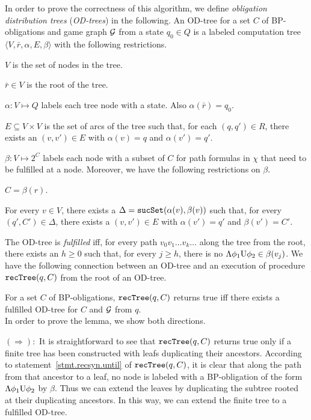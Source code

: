 In order to prove the correctness of this algorithm,
we define {\em obligation distribution trees} ({\em OD-trees})
in the following.
An OD-tree for a set $C$ of BP-obligations and
game graph ${\cal G}$
from a state $q_0\in Q$ is a labeled computation tree
$\langle V,\bar{r},\alpha,E,\beta\rangle$ with
the following restrictions.
\begin{list1}
\item $V$ is the set of nodes in the tree.
\item $\bar{r}\in V$ is the root of the tree.
\item $\alpha:V\mapsto Q$ labels each tree node with a state.
\label{reply2.correct.g2q} 
    Also $\alpha(\bar{r})=q_0$.
\item $E\subseteq V\times V$ is the set of arcs of the tree
    such that, for each $(q,q')\in R$,
    there exists an $(v,v')\in E$ with $\alpha(v)=q$ and $\alpha(v')=q'$.
\item $\beta:V\mapsto 2^C$ labels
    each node with a subset of $C$ for path formulas in $\chi$
    that need to be fulfilled at a node.  
    Moreover, we have the following restrictions on $\beta$.
    \begin{list2}
    \item $C= \beta(r)$.\label{reply2.C.eq.betar}  
    \item For every $v\in V$,
        there exists a 
        $\Delta=\mbox{\tt sucSet}(\alpha(v),\beta(v))$
        such that,
        for every $(q',C')\in \Delta$,
        there exists a $(v,v')\in E$ with
        $\alpha(v')=q'$ and $\beta(v')=C'$.
    \end{list2}
\end{list1}
The OD-tree is {\em fulfilled} iff, for every
path $v_0v_1\ldots v_k\ldots$ along the tree from the root,
there exists an $h\geq 0$ such that,
for every $j\geq h$, there is no $\Lambda\phi_1\textrm{U}\phi_2\in \beta(v_j)$.  
We have the following connection between an OD-tree and an
execution of procedure
\mbox{$\mbox{\tt recTree}(q,C)$}
from the root of an OD-tree.

{\lemma \label{lemma.rectree.sitree}
For a set $C$ of BP-obligations, 
$\mbox{\tt recTree}(q,C)$ returns true iff
there exists a fulfilled OD-tree for $C$ and ${\cal G}$ from $q$.
}\\\pf 
In order to prove the lemma, we show both directions.

\noindent $(\Rightarrow):$
It is straightforward to see that $\mbox{\tt recTree}(q,C)$
returns true only if a finite tree has been constructed
with leafs duplicating their ancestors.
According to statement~\ref{stmt.recsyn.until} of $\mbox{\tt recTree}(q,C)$,
it is clear that along the path from that ancestor to a leaf, no
node is labeled with a BP-obligation of the form $\Lambda\phi_1\textrm{U}\phi_2$ 
by $\beta$.
Thus we can extend the leaves by duplicating the subtree rooted
at their duplicating ancestors.
In this way, we can extend the finite tree to a fulfilled OD-tree.

